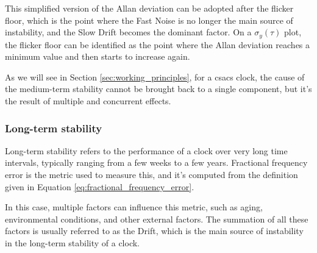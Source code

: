This simplified version of the Allan deviation can be adopted after the flicker floor, which is the point where the Fast Noise is no longer the main source of instability, and the Slow Drift becomes the dominant factor.
On a $\sigma_y(\tau)$ plot, the flicker floor can be identified as the point where the Allan deviation reaches a minimum value and then starts to increase again.

As we will see in Section \ref{sec:working_principles}, for a \acrshort{csacs} clock, the cause of the medium-term stability cannot be brought back to a single component, but it's the result of multiple and concurrent effects.


\subsubsection{Long-term stability}

Long-term stability refers to the performance of a clock over very long time intervals, typically ranging from a few weeks to a few years.
Fractional frequency error is the metric used to measure this, and it's computed from the definition given in Equation \ref{eq:fractional_frequency_error}.

In this case, multiple factors can influence this metric, such as aging, environmental conditions, and other external factors.
The summation of all these factors is usually referred to as the Drift, which is the main source of instability in the long-term stability of a clock.

